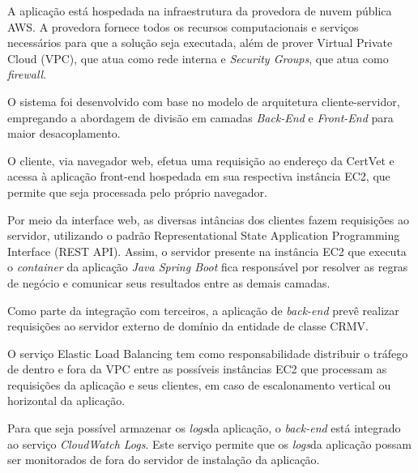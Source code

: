 \documentclass[
    12pt,               %
    openright,          %
    oneside,
    a4paper,            %
    BIBLATEX,           %
    TODO,               %
    english,            %
    brazil              %
    ]{ifsp-spo-inf-ctds}
\begin{document}

        


        A aplicação está hospedada na infraestrutura da provedora de nuvem pública AWS. A provedora fornece todos os recursos computacionais e serviços necessários para que a solução seja executada, além de prover Virtual Private Cloud (VPC), que atua como rede interna e \emph{Security Groups}, que atua como \emph{firewall}.

        O sistema foi desenvolvido com base no modelo de arquitetura cliente-servidor, empregando a abordagem de divisão em camadas \emph{Back-End} e \emph{Front-End} para maior desacoplamento.

        O cliente, via navegador web, efetua uma requisição ao endereço da CertVet e acessa à aplicação front-end hospedada em sua respectiva instância EC2, que permite que seja processada pelo próprio navegador.

        Por meio da interface web, as diversas intâncias dos clientes fazem requisições ao servidor, utilizando o padrão Representational State Application Programming Interface (REST API).
        Assim, o servidor presente na instância EC2 que executa o \emph{container} da aplicação \emph{Java Spring Boot} fica responsável por resolver as regras de negócio e comunicar seus resultados entre as demais camadas.

        Como parte da integração com terceiros, a aplicação de \emph{back-end} prevê realizar requisições ao servidor externo de domínio da entidade de classe CRMV.

        O serviço Elastic Load Balancing tem como responsabilidade distribuir o tráfego de dentro e fora da VPC entre as possíveis instâncias EC2 que processam as requisições da aplicação e seus clientes, em caso de escalonamento vertical ou horizontal da aplicação.

        Para que seja possível armazenar os \emph{logs}da aplicação, o \emph{back-end} está integrado ao serviço \emph{CloudWatch Logs}. Este serviço permite que os \emph{logs}da aplicação possam ser monitorados de fora do servidor de instalação da aplicação.
\end{document}
